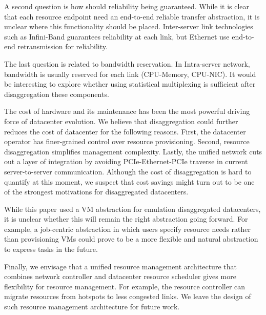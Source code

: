 A second question is how should reliability being guaranteed. 
While it is clear that each resource endpoint need an end-to-end reliable transfer abstraction, it is unclear where this functionality should be placed.
Inter-server link technologies such as Infini-Band guarantees reliability at each link, but Ethernet use end-to-end retransmission for reliability. 

The last question is related to bandwidth reservation. In Intra-server network, bandwidth is usually reserved for each link (CPU-Memory, CPU-NIC). 
It would be interesting to explore whether using statistical multiplexing is sufficient after disaggregation these components.





The cost of hardware and its maintenance has been the most powerful driving force of datacenter evolution.
We believe that disaggregation could further reduces the cost of datacenter for the following reasons.
First, the datacenter operator has finer-grained control over resource provisioning. 
Second, resource disaggregation simplifies management complexity. 
Lastly, the unified network cuts out a layer of integration by avoiding PCIe-Ethernet-PCIe traverse in current server-to-server communication.
Although the cost of disaggregation is hard to quantify at this moment, we suspect that
cost savings might turn out to be one of the strongest motivations for disaggregated datacenters.

While this paper used a VM abstraction for emulation disaggregated datacenters, it is unclear whether this will remain the right abstraction going forward.
For example, a job-centric abstraction in which users specify resource needs rather than provisioning VMs could prove to be a more flexible and natural abstraction to express tasks in the future.

Finally, we envisage that a unified resource management architecture that combines network controller and datacenter resource scheduler gives more flexibility for resource management.
For example, the resource controller can migrate resources from hotspots to less congested links.
We leave the design of such resource management architecture for future work.



